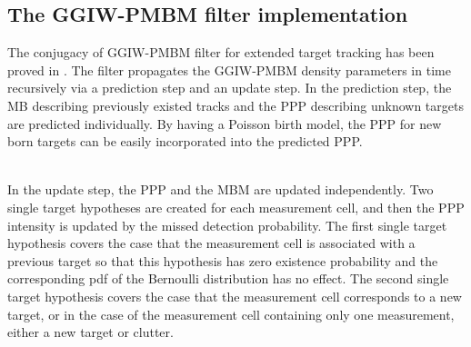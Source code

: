 
\subsection{The GGIW-PMBM filter implementation}
The conjugacy of GGIW-PMBM filter for extended target tracking has been proved in \cite{pmbmextended2}. The filter propagates the GGIW-PMBM density parameters in time recursively via a prediction step and an update step. In the prediction step, the MB describing previously existed tracks and the PPP describing unknown targets are predicted individually. By having a Poisson birth model, the PPP for new born targets can be easily incorporated into the predicted PPP. 

~\\
In the update step, the PPP and the MBM are updated independently. Two single target hypotheses are created for each measurement cell, and then the PPP intensity is updated by the missed detection probability. The first single target hypothesis covers the case that the measurement cell is associated with a previous target so that this hypothesis has zero existence probability and the corresponding pdf of the Bernoulli distribution has no effect. The second single target hypothesis covers the case that the measurement cell corresponds to a new target, or in the case of the measurement cell containing only one measurement, either a new target or clutter.  

